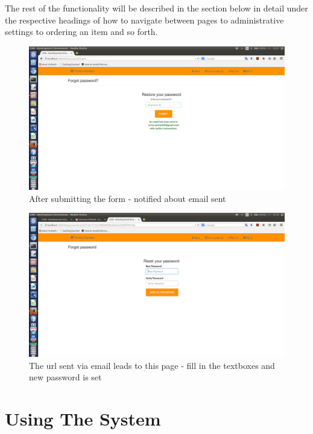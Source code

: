 \documentclass[a4paper,12pt]{report}
\begin{document}
The rest of the functionality will be described in the section below in detail  under the respective headings of how to navigate between pages to administrative settings to ordering an item and so forth. 
 
\begin{figure}[H]
  \centering
    \includegraphics[width=1.0\textwidth]{screenshots/emailSentForPass.png}
    \caption{After submitting the form - notified about email sent} 
\end{figure}

\begin{figure}[H]
  \centering
    \includegraphics[width=1.0\textwidth]{screenshots/newPassForPass.png}
    \caption{The url sent via email leads to this page - fill in the textboxes and new password is set} 
\end{figure}


\section{Using The System} 
\end{document}

